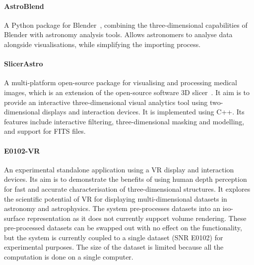 \paragraph{AstroBlend}
A Python package for Blender~\cite{Naiman2016}, combining the three-dimensional capabilities of Blender with astronomy analysis tools.
Allows astronomers to analyse data alongside visualisations, while simplifying the importing process.

\paragraph{SlicerAstro} %
A multi-platform open-source package for visualising and processing medical images,
which is an extension of the open-source software 3D slicer~\cite{Fedorov2012}.
It aim is to provide an interactive three-dimensional visual analytics tool using two-dimensional displays and interaction devices.
It is implemented using C++.
Its features include interactive filtering, three-dimensional masking and modelling, and support for FITS files.

\paragraph{E0102-VR}
\cite{Baracaglia2019}
An experimental standalone application using a VR display and interaction devices.
Its aim is to demonstrate the benefits of using human depth perception for fast and accurate characterisation of three-dimensional structures.
It explores the scientific potential of VR for displaying multi-dimensional datasets in astronomy and astrophysics.
The system pre-processes datasets into an iso-surface representation as it does not currently support volume rendering.
These pre-processed datasets can be swapped out with no effect on the functionality, but the system is currently coupled to a single dataset (SNR E0102) for experimental purposes.
The size of the dataset is limited because all the computation is done on a single computer.
